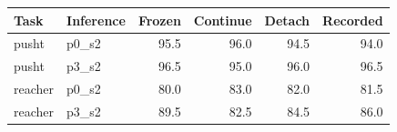 \begin{tabular}{llrrrr}
\toprule
Task & Inference & Frozen & Continue & Detach & Recorded \\
\midrule
pusht & p0\_s2 & 95.5 & 96.0 & 94.5 & 94.0 \\
pusht & p3\_s2 & 96.5 & 95.0 & 96.0 & 96.5 \\
reacher & p0\_s2 & 80.0 & 83.0 & 82.0 & 81.5 \\
reacher & p3\_s2 & 89.5 & 82.5 & 84.5 & 86.0 \\
\bottomrule
\end{tabular}
